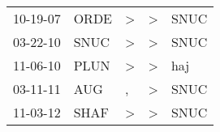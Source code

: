 \begin{supertabular}{lllll}
 10-19-07 &  ORDE &  \textgreater &  \textgreater &  SNUC \\
 03-22-10 &  SNUC &  \textgreater &  \textgreater &  SNUC \\
 11-06-10 &  PLUN &  \textgreater &  \textgreater &   haj \\
 03-11-11 &   AUG &             , &  \textgreater &  SNUC \\
 11-03-12 &  SHAF &  \textgreater &  \textgreater &  SNUC \\
\end{supertabular}
